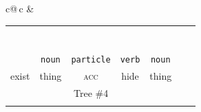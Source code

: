 \documentclass[a4paper,landscape,headrule,footrule,xetex]{foils}
\newcommand{\sa}[2]{\rnode{c#1}{\iz{#2}}}%
\begin{document}
{\begin{tabular}{c@{\,}c}
&
  \begin{tabular}{ccccccc}
    &\multicolumn{5}{c}{\sa{1}{NP-frag}}  \\[1ex]
    &\multicolumn{5}{c}{\sa{2}{\wl{rel-clause}}}  \\[1ex]
    &\multicolumn{3}{c}{\sa{3}{hd-complement}} & \sa{4}{N} \\[1ex]
    \multicolumn{3}{c}{\sa{5}{hd-complement}} & \multicolumn{1}{c}{\sa{J}{\wl{subj-zpro}}} &
    \\[1ex]
    \multicolumn{2}{c}{\sa{I}{\ul{rel-cl-sbj-gap}}} & & \sa{K}{V} &  & \\[1ex]
    \sa{H}{V} & \sa{7}{N}      & \sa{8}{CASE-P} &   &  \\[1ex]
    \sa{G}{ある} & \sa{B}{物事} & \sa{C}{を} & \sa{D}{隠す} &  \sa{F}{ 物} \\
   \texttt{\emp{\ul{verb}}} & \texttt{noun} & \texttt{particle} & \texttt{verb} & \texttt{noun} \\
    exist & thing &  \textsc{acc} & hide &  thing \\
   \multicolumn{5}{c}{Tree \#4} \\ \\
  \end{tabular}
   
   
   
    
   
   
    



\end{tabular}}
\end{document}
